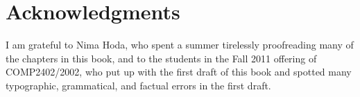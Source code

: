 \chapter*{Acknowledgments}

I am grateful to Nima Hoda, who spent a summer tirelessly proofreading
many of the chapters in this book, and to the students in the Fall 2011
offering of COMP2402/2002, who put up with the first draft of this book
and spotted many typographic, grammatical, and factual errors in the
first draft.
